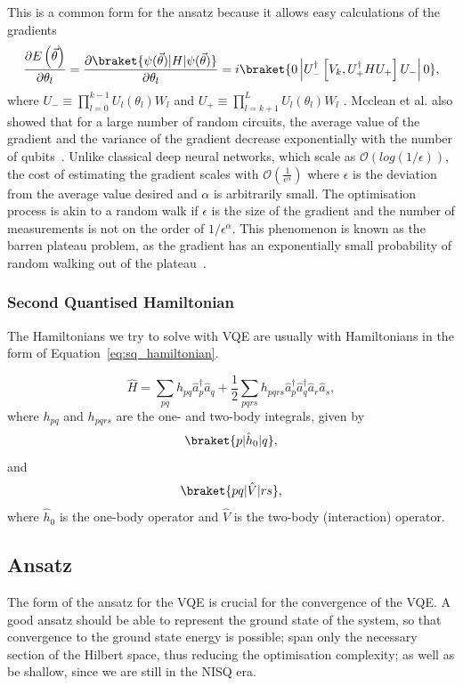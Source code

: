 This is a common form for the ansatz because it allows easy calculations of the gradients
\begin{equation}
	\label{eq:gradient}
	\frac{\partial E\left( \vec{\theta} \right) }{\partial \theta_l} = \frac{\partial \braket{\psi(\vec{\theta})|H|\psi(\vec{\theta})}}{\partial \theta_l} =
	i\braket{0\left|U_{-}^{\dagger}\left[V_k, U_{+}^{\dagger} H U_{+}\right] U_{-}\right| 0},
\end{equation}
where $U_{-} \equiv \prod_{l=0}^{k-1} U_l\left(\theta_l\right) W_l$ and $U_{+} \equiv \prod_{l=k+1}^{L} U_l\left(\theta_l\right) W_l$ \cite{mcclean2018}.
Mcclean et al. also showed that for a large number of random circuits, the average value of the gradient and the variance of the gradient decrease exponentially with the number of qubits~\cite{mcclean2018}. Unlike classical deep neural networks, which scale as $ \mathcal{O}(log(1/\epsilon)) $, the cost of estimating the gradient scales with $ \mathcal{O}(\frac{1}{\epsilon^\alpha})$ where $ \epsilon $ is the deviation from the average value desired and $ \alpha $ is arbitrarily small. The optimisation process is akin to a random walk if $ \epsilon $ is the size of the gradient and the number of measurements is not on the order of $ 1/ \epsilon^{\alpha}$. 
This phenomenon is known as the barren plateau problem, as the gradient has an exponentially small probability of random walking out of the plateau~\cite{mcclean2018}.


\subsubsection{Second Quantised Hamiltonian}%
\label{ssub:second_quantised_hamiltonian}
The Hamiltonians we try to solve with VQE are usually with Hamiltonians in the form of Equation~\eqref{eq:sq_hamiltonian}.

\begin{equation}
	\label{eq:sq_hamiltonian}
	\hat H = \sum_{pq} h_{pq} \hat a_p^\dagger \hat a_q + { \frac{1}{2} \sum_{pqrs} h_{pqrs} \hat a_p^\dagger \hat a_q^\dagger \hat a_r \hat a_s},
\end{equation}
where $ h_{pq} $ and $ h_{pqrs} $ are the one- and two-body integrals, given by 
\[\braket{p|\hat h_0|q}, \] 
and 
\[ \braket{pq|\hat V|rs}, \] 
where $ \hat h_0 $ is the one-body operator and $ \hat V $ is the two-body (interaction) operator.


\subsection{Ansatz}
\label{sub:ansatz}
The form of the ansatz for the VQE is crucial for the convergence of the VQE. A good ansatz should be able to represent the ground state of the system, so that convergence to the ground state energy is possible; span only the necessary section of the Hilbert space, thus reducing the optimisation complexity; as well as be shallow, since we are still in the NISQ era. 

